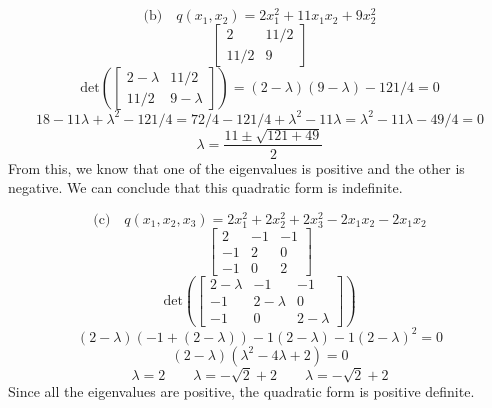 \documentclass[hidelinks]{article}
\begin{document}
\[
	\text{(b)} \quad q(x_1, x_2) = 2x_1^2 + 11x_1x_2 + 9x_2^2
\]
\[
	\begin{bmatrix} 2 & 11/2 \\ 11/2 & 9 \end{bmatrix}
\]
\[
	\text{det}( \begin{bmatrix} 2 - \lambda & 11/2 \\ 11/2 & 9 - \lambda \end{bmatrix}) = (2-\lambda)(9-\lambda) - 121/4 = 0
\]
\[
	18 - 11\lambda +  \lambda^2 - 121/4 = 72/4 -121/4 + \lambda^2 - 11\lambda = \lambda^2 - 11\lambda - 49/4 = 0 
\]
\[
	\lambda = \frac{11 \pm \sqrt{121 + 49}}{2}
\]
From this, we know that one of the eigenvalues is positive and the other is negative. We can conclude that this quadratic form is indefinite.

\[
	\text{(c)} \quad q(x_1, x_2, x_3) = 2x_1^2 + 2x_2^2 + 2x_3^2 -2x_1x_2-2x_1x_2
\]
\[
	\begin{bmatrix} 2 & -1 & -1 \\ -1 & 2 & 0 \\ -1 & 0 & 2 \end{bmatrix}
\]
\[
	\text{det}(\begin{bmatrix} 2 -\lambda & -1 & -1 \\ -1 & 2 -\lambda & 0 \\ -1 & 0 & 2 -\lambda \end{bmatrix})
\]
\[
	(2-\lambda)(-1 + (2-\lambda)) -1(2-\lambda) -1(2-\lambda)^2 = 0
\]
\[
	(2-\lambda)(\lambda^2-4\lambda + 2) = 0
\]
\[
	\lambda = 2 \quad \quad \lambda = -\sqrt{2} + 2\quad \quad \lambda = -\sqrt{2} + 2
\]
Since all the eigenvalues are positive, the quadratic form is positive definite.

\newpage
\end{document}
